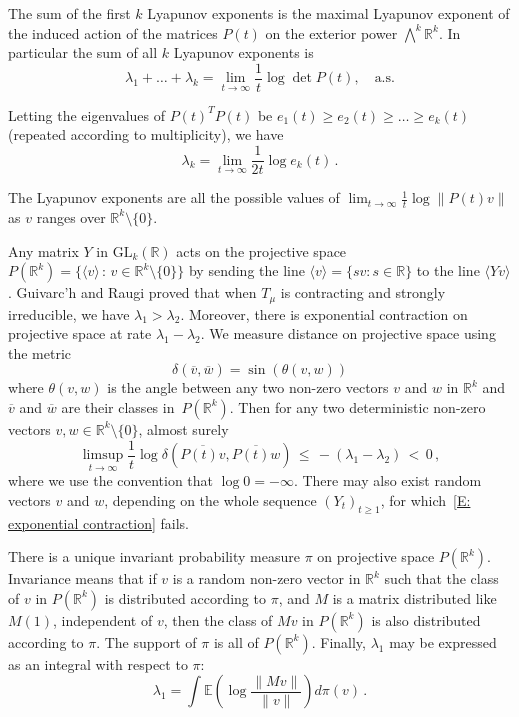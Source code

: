 \documentclass[12pt]{article}
\newcommand{\1}{\mathbf{1}}
\begin{document}
The sum of the first $k$ Lyapunov exponents is the maximal Lyapunov exponent of the induced action of the matrices $P(t)$ on the exterior power $\bigwedge^k \mathbb{R}^{k}$. In particular the sum of all $k$ Lyapunov exponents is 
$$ 
\lambda_1 + \dots + \lambda_{k} = \lim_{t \to \infty} \frac{1}{t}\log \det P(t), \quad \text{a.s.}
$$ 

Letting the eigenvalues of $P(t)^TP(t)$ be $e_1(t) \ge e_2(t) \ge \dots \ge e_{k}(t)$ (repeated according to multiplicity), we have 
$$
\lambda_k = \lim_{t \to \infty} \frac{1}{2t} \log  e_k(t)\,.
$$

The Lyapunov exponents are all the possible values of $ \lim_{t \to \infty} \frac{1}{t}\log \|P(t)v\|$ as $v$ ranges over $\mathbb{R}^{k} \setminus \{0\}$.

{Any matrix $Y$ in $\mathrm{GL}_k(\mathbb{R})$ acts on the projective space $P(\mathbb{R}^k) = \{ \langle v \rangle\,:\, v \in \mathbb{R}^k\setminus\{0\}\}$ by sending the line $\langle v \rangle = \{sv: s \in \mathbb{R}\}$ to the line $\langle Yv\rangle$.} Guivarc'h and Raugi \cite{GR} proved that when $T_\mu$ is contracting and strongly irreducible, we have $\lambda_1 > \lambda_2$. Moreover, there is exponential contraction on projective space at rate $\lambda_1-\lambda_2$. We measure distance on projective space using the metric
$$ 
\delta(\overline{v},\overline{w})  = \sin(\theta(v,w))
$$ 
where $\theta(v,w)$ is the angle between any two non-zero vectors $v$ and $w$ in $\mathbb{R}^{k}$ and $\overline{v}$ and $\overline{w}$ are their classes in~$P\left(\mathbb{R}^{k}\right)$.  Then for any two deterministic non-zero vectors $v, w \in \mathbb{R}^{k}\setminus \{0\}$, almost surely
\begin{equation}\label{E: exponential contraction} \limsup_{t \to \infty} \frac{1}{t} \log \delta\left(\overline{P(t)v},\overline{P(t)w}\right) \,\le\, -(\lambda_1 - \lambda_2)\,<\, 0\,,
\end{equation} 
where we use the convention that $\log 0 = -\infty$. There may also exist random vectors $v$ and $w$, depending on the whole sequence $\left(Y_t\right)_{t \ge 1}$, for which~\eqref{E: exponential contraction} fails.

There is a unique invariant probability measure $\pi$ on projective space $P(\mathbb{R}^{k})$. Invariance means that if $v$ is a random non-zero vector in $\mathbb{R}^{k}$ such that the class of $v$ in $P\left(\mathbb{R}^{k}\right)$ is distributed according to $\pi$, and $M$ is a matrix distributed like $M(1)$, independent of $v$, then the class of $Mv$ in $P\left(\mathbb{R}^{k}\right)$ is also distributed according to $\pi$. The support of $\pi$ is all of $P\left(\mathbb{R}^{k}\right)$. Finally, $\lambda_1$ may be expressed as an integral with respect to $\pi$: 
$$
\lambda_1 = \int \mathbb{E}\left(\log \frac{\|Mv\|}{\|v\|} \right) d\pi(v) \,.
$$
\end{document}
